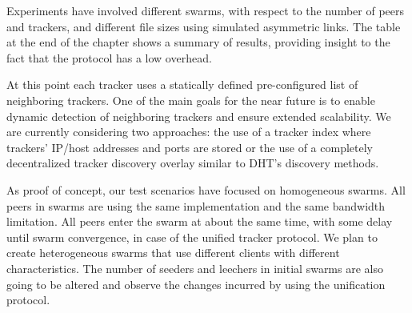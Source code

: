 Experiments have involved different swarms, with respect to the number of
peers and trackers, and different file sizes using simulated asymmetric links.
The table at the end of the chapter shows a summary of results, providing
insight to the fact that the protocol has a low overhead.

At this point each tracker uses a statically defined pre-configured list of
neighboring trackers. One of the main goals for the near future is to enable
dynamic detection of neighboring trackers and ensure extended scalability. We
are currently considering two approaches: the use of a tracker index where
trackers' IP/host addresses and ports are stored or the use of a completely
decentralized tracker discovery overlay similar to DHT's discovery methods.

As proof of concept, our test scenarios have focused on homogeneous swarms.
All peers in swarms are using the same implementation and the same bandwidth
limitation. All peers enter the swarm at about the same time, with some delay
until swarm convergence, in case of the unified tracker protocol. We plan to
create heterogeneous swarms that use different clients with different
characteristics. The number of seeders and leechers in initial swarms are also
going to be altered and observe the changes incurred by using the unification
protocol.
